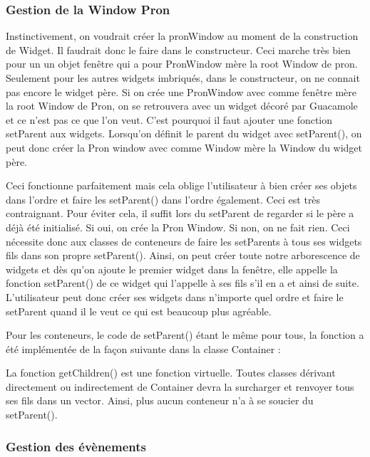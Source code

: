 \subsubsection{Gestion de la Window Pron}

Instinctivement, on voudrait créer la pronWindow au moment de la construction de Widget.
Il faudrait donc le faire dans le constructeur.
Ceci marche très bien pour un un objet fenêtre qui a pour PronWindow mère la root Window de pron.
Seulement pour les autres widgets imbriqués, dans le constructeur, on ne connait pas encore le widget père.
Si on crée une PronWindow avec comme fenêtre mère la root Window de Pron, on se retrouvera avec un widget décoré par Guacamole et ce n'est pas ce que l'on veut.
C'est pourquoi il faut ajouter une fonction setParent aux widgets.
Lorsqu'on définit le parent du widget avec setParent(), on peut donc créer la Pron window avec comme Window mère la Window du widget père.

Ceci fonctionne parfaitement mais cela oblige l'utilisateur à bien créer ses objets dans l'ordre et faire les setParent() dans l'ordre également.
Ceci est très contraignant.
Pour éviter cela, il suffit lors du setParent de regarder si le père a déjà été initialisé.
Si oui, on crée la Pron Window.
Si non, on ne fait rien.
Ceci nécessite donc aux classes de conteneurs de faire les setParents à tous ses widgets fils dans son propre setParent().
Ainsi, on peut créer toute notre arborescence de widgets et dès qu'on ajoute le premier widget dans la fenêtre, elle appelle la fonction setParent() de ce widget qui l'appelle à ses fils s'il en a et ainsi de suite.
L'utilisateur peut donc créer ses widgets dans n'importe quel ordre et faire le setParent quand il le veut ce qui est beaucoup plus agréable.

Pour les conteneurs, le code de setParent() étant le même pour tous, la fonction a été implémentée de la façon suivante dans la classe Container :



La fonction getChildren() est une fonction virtuelle. Toutes classes dérivant directement ou indirectement de Container devra la surcharger et renvoyer tous ses fils dans un vector. Ainsi, plus aucun conteneur n'a à se soucier du setParent().

\subsubsection{Gestion des évènements}

